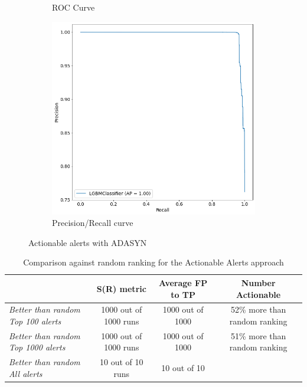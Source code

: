\begin{figure}[H]
\begin{subfigure}{.5\textwidth}
		\caption{ROC Curve}\label{}
	\end{subfigure}%
	\begin{subfigure}{.5\textwidth}
		\centering
		\includegraphics[scale=0.3]{./src/actAlerts/actalerts_adasyn_pr.png}
		\caption{Precision/Recall curve}\label{}
	\end{subfigure}  
	\caption{Actionable alerts with ADASYN}
	\label{results:actalerts_best}
\end{figure}

\begin{table}[H]
	\caption{Comparison against random ranking for the Actionable Alerts approach}
	\label{results:ranking_actalerts}
	\centering
	\begin{tabular}{@{}lccc@{}}
		\toprule
		& \textbf{S(R) metric}  & \textbf{Average FP to TP} & \textbf{Number Actionable}    \\ \midrule
		\textit{Better than random Top 100 alerts}  & 1000 out of 1000 runs & 1000 out of 1000          & 52\% more than random ranking \\
		\textit{Better than random Top 1000 alerts} & 1000 out of 1000 runs & 1000 out of 1000          & 51\% more than random ranking \\
		\textit{Better than random All alerts}      & 10 out of 10 runs     & 10 out of 10              & \multicolumn{1}{l}{}          \\ \bottomrule
	\end{tabular}
\end{table}

